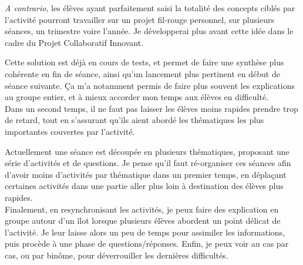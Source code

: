\documentclass[pdftex,a4paper,12pt]{article}
\begin{document}
	\emph{A contrario}, les élèves ayant parfaitement saisi la totalité des concepts ciblés par l'activité 
	pourront travailler sur un projet \og{}fil-rouge\fg{} personnel, sur plusieurs séances, un trimestre voire l'année.
	Je développerai plus avant cette idée dans le cadre du \og{}Projet Collaboratif Innovant\fg{}.

	Cette solution est déjà en cours de tests, et permet de faire une synthèse plus cohérente en fin de séance, 
	ainsi qu'un lancement plus pertinent en début de séance suivante.
	Ça m'a notamment permis de faire plus souvent les explications au groupe entier, et à mieux accorder mon temps aux élèves en difficulté.\\

	Dans un second temps, il ne faut pas laisser les élèves moins rapides prendre trop de retard, 
	tout en s'assurant qu'ils aient abordé les thématiques les plus importantes couvertes par l'activité.

	Actuellement une séance est découpée en plusieurs thématiques, proposant une série d'activités et de questions.
	Je pense qu'il faut ré-organiser ces séances afin d'avoir moins d'activités par thématique dans un premier temps, 
	en déplaçant certaines activités dans une partie \og{}aller plus loin\fg{} à destination des élèves plus rapides.\\

	Finalement, en resynchronisant les activités, je peux faire des explication en groupe autour d'un îlot 
	lorsque plusieurs élèves abordent un point délicat de l'activité.
	Je leur laisse alors un peu de temps pour assimiler les informations, puis procède à une phase de questions/réponses.
	Enfin, je peux voir au cas par cas, ou par binôme, pour déverrouiller les dernières difficultés.
\end{document}
